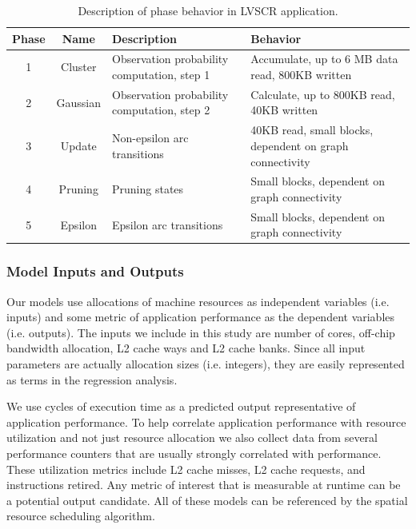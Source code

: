 \begin{table}[t]
\footnotesize
\begin{tabular}{|c|c|l|l|}
\hline
 Phase  & Name & Description & Behavior \\ \hline 
 1 & Cluster  & Observation probability computation, step 1 &  Accumulate, up to 6 MB data read, 800KB written\\ \hline
 2 & Gaussian  & Observation probability computation, step 2 &  Calculate, up to 800KB read, 40KB written\\ \hline
 3 & Update & Non-epsilon arc transitions &40KB read, small blocks, dependent on graph connectivity\\ \hline
 4 & Pruning & Pruning states & Small blocks, dependent on graph connectivity\\ \hline
 5 & Epsilon & Epsilon arc transitions & Small blocks, dependent on graph connectivity\\ \hline
\end{tabular}
\caption{Description of phase behavior in LVSCR application.}
\label{table:app}
\end{table}

\subsubsection*{Model Inputs and Outputs}
Our models use allocations of machine resources as independent variables (i.e. inputs) and some metric of application performance as the dependent variables (i.e. outputs).  The inputs we include in this study are number of cores, off-chip bandwidth allocation, L2 cache ways and L2 cache banks.  Since all input parameters are actually allocation sizes (i.e. integers), they are easily represented as terms in the regression analysis.

We use cycles of execution time as a predicted output representative of application performance.  To help correlate application performance with resource utilization and not just resource allocation we also collect data from several performance counters that are usually strongly correlated with performance. These utilization metrics include L2 cache misses, L2 cache requests, and instructions retired. Any metric of interest that is measurable at runtime can be a potential output candidate. All of these models can be referenced by the spatial resource scheduling algorithm.


